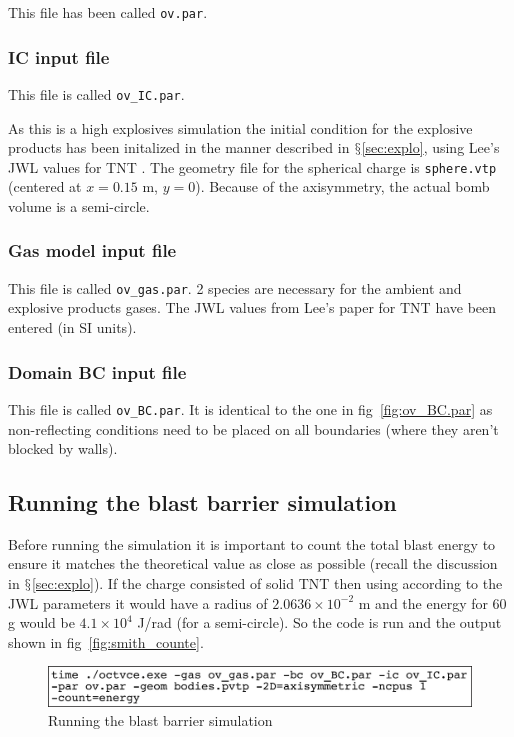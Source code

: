 \documentclass[pdftex, 12pt, a4paper]{report}
\begin{document}
This file has been called \verb'ov.par'.

\subsubsection{IC input file}

This file is called \verb'ov_IC.par'.

As this is a high explosives simulation the initial condition for the explosive products has been initalized in the manner described
in $\mathsection$\ref{sec:explo}, using Lee's JWL values for TNT \cite{Lee:ae}.  The geometry file for the spherical charge is
\verb'sphere.vtp' (centered at $x = 0.15$ m, $y = 0$).  Because of the axisymmetry, the actual bomb volume is a semi-circle.  

\subsubsection{Gas model input file}

This file is called \verb'ov_gas.par'.  2 species are necessary for the ambient and explosive products gases.  The JWL values
from Lee's paper \cite{Lee:ae} for TNT have been entered (in SI units).

\subsubsection{Domain BC input file}

This file is called \verb'ov_BC.par'.  It is identical to the one in fig~\ref{fig:ov_BC.par} as non-reflecting conditions
need to be placed on all boundaries (where they aren't blocked by walls).

\subsection{Running the blast barrier simulation}\label{sec:smith_run}

Before running the simulation it is important to count the total blast energy to ensure it matches the theoretical value
as close as possible (recall the discussion in $\mathsection$\ref{sec:explo}).  If the charge consisted of solid TNT then using 
according to the JWL parameters it would have a 
radius of $2.0636 \times 10^{-2}$ m and the energy for 60 g would be $4.1 \times 10^4$ J/rad (for a semi-circle).  So the code is run 
and the output shown in fig~\ref{fig:smith_counte}.   

\begin{figure}[htp]
\centering
\includegraphics[width=14cm]{pics/cmd_exe_barrier1.jpg}
\caption{Running the blast barrier simulation}
\label{fig:smith_run}
\end{figure}
\end{document}
